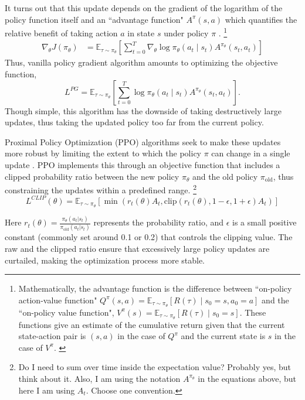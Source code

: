 It turns out that this update depends on the gradient of the logarithm of the policy function itself and an ``advantage function" \( A^\pi (s, a) \) which quantifies the relative benefit of taking action \( a \) in state \( s \) under policy \( \pi \) \cite{SpinningUp2018}.
\footnote{
Mathematically, the advantage function is the difference between ``on-policy action-value function" $Q^{\pi}(s, a) = \mathbb{E}_{\tau \sim \pi_\theta} [R(\tau) \mid s_0 = s, a_0 = a]$ and the ``on-policy value function", $V^{\pi}(s) = \mathbb{E}_{\tau \sim \pi_\theta} [R(\tau) \mid s_0 = s]$. These functions give an estimate of the cumulative return given that the current state-action pair is $(s, a)$ in the case of $Q^\pi$ and the current state is $s$ in the case of $V^{\pi}$.
\label{ft:advantage}
}
\begin{align*}
	\nabla_\theta J(\pi_\theta) &= \mathbb{E}_{\tau \sim \pi_\theta} \left[ \sum\limits_{t=0}^T \nabla_\theta \log 								\pi_\theta (a_t \mid s_t) A^{\pi_\theta} (s_t, a_t) \right]
\end{align*}
Thus, vanilla policy gradient algorithm amounts to optimizing the objective function, 
\[
L^{PG} = \mathbb{E}_{\tau \sim \pi_\theta} \left[ \sum\limits_{t=0}^T \log 								\pi_\theta (a_t \mid s_t) A^{\pi_\theta} (s_t, a_t) \right].
\]
Though simple, this algorithm has the downside of taking destructively large updates, thus taking the updated policy too far from the current policy.
\newline 

Proximal Policy Optimization (PPO) algorithms seek to make these updates more robust by limiting the extent to which the policy \( \pi \) can change in a single update \cite{schulman2017proximal}.
PPO implements this through an objective function that includes a clipped probability ratio between the new policy \( \pi_\theta \) and the old policy \( \pi_{\text{old}} \), thus constraining the updates within a predefined range. 
\footnote{Do I need to sum over time inside the expectation value? Probably yes, but think about it. Also, I am using the notation $A^{\pi_\theta}$ in the equations above, but here I am using $A_t$. Choose one convention.}
\[
L^{CLIP}(\theta) = \mathbb{E}_{\tau \sim \pi_\theta} \left[ \min(r_t(\theta) A_t, \text{clip}(r_t(\theta), 1 - \epsilon, 1 + \epsilon) A_t) \right]
\]

Here \( r_t(\theta) = \frac{\pi_\theta(a_t | s_t)}{\pi_{\text{old}}(a_t | s_t)} \) represents the probability ratio, and \( \epsilon \) is a small positive constant (commonly set around 0.1 or 0.2) that controls the clipping value. The raw and the clipped ratio ensure that excessively large policy updates are curtailed, making the optimization process more stable.
\newline 

